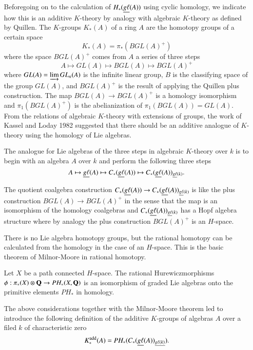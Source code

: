 Before\pageoriginale going on to the calculation of
$H_{\ast}(\underline{g\ell}(A))$ using cyclic homology, we indicate how this
is an additive $K$-theory by analogy with algebraic $K$-theory as
defined by Quillen. The $K$-groups $K_{\ast}(A)$ of a ring $A$ are the
homotopy groups of a certain space
$$
K_{\ast}(A)=\pi_{\ast}(BGL(A)^{+})
$$
where the space $BGL(A)^{+}$ comes from $A$ a series of three steps
$$
A\mapsto GL(A)\mapsto BGL(A)\mapsto BGL(A)^{+}
$$
where $GL(A)=\varinjlim GL_{n}(A)$ is the infinite linear group, $B$
is the classifying space of the group $GL(A)$, and $BGL(A)^{+}$ is the
result of applying the Quillen plus construction. The map $BGL(A)\to
BGL(A)^{+}$ is a homology isomorphism and $\pi_{1}(BGL(A)^{+})$ is the
abelianization of $\pi_{1}(BGL(A))=GL(A)$. From the relations of
algebraic $K$-theory with extensions of groups, the work of
Kassel and Loday 1982 suggested that there should be an additive
analogue of 
$K$-theory using the homology of Lie algebras.

The analogue for Lie algebras of the three steps in algebraic
$K$-theory over $k$ is to begin with an algebra $A$ over $k$ and
perform the following three steps
$$
A\mapsto \underline{g\ell}(A)\mapsto C_{\ast}(\underline{g\ell}(A))\mapsto
C_{\ast}(\underline{g\ell}(A))_{\underline{g\ell}(k)}.
$$

The quotient coalgebra construction $C_{\ast}(\underline{g\ell}(A))\to
C_{\ast}(\underline{g\ell}(A))_{\underline{g\ell}(k)}$ is like the plus construction
$BGL(A)\to BGL(A)^{+}$ in the sense that the map is an isomorphism of
the homology coalgebras and $C_{\ast}(\underline{g\ell}(A))_{\underline{g\ell}(k)}$
has a Hopf algebra structure where by analogy the plus construction
$BGL(A)^{+}$ is an $H$-space.

There is no Lie algebra homotopy groups, but the rational homotopy can
be calculated from the homology in the case of an $H$-space. This is
the basic theorem of Milnor-Moore in
rational homotopy. 

\begin{theorem}\label{chap4-thm4.3}
Let $X$ be a path connected $H$-space. The rational
Hure\-wicz\pageoriginale morphisms $\phi:\pi_{\ast}(X)\otimes \mathbf{Q}\to
PH_{\ast}(X,\mathbf{Q})$ is an isomorphism of graded Lie algebras onto the
primitive elements $PH_{\ast}$ in homology.
\end{theorem}

\begin{remark}\label{chap4-rem4.4}
The above considerations together with the Milnor-Moore theorem led
\cite{Feigin1985} to introduce the following definition of the
additive $K$-groups of algebras $A$ over a filed $k$ of characteristic
zero 
$$
K^{\operatorname{add}}_{\ast}(A)=PH_{\ast}(C_{\ast}(\underline{g\ell}(A))_{\underline{g\ell(k)}}).
$$
\end{remark}



